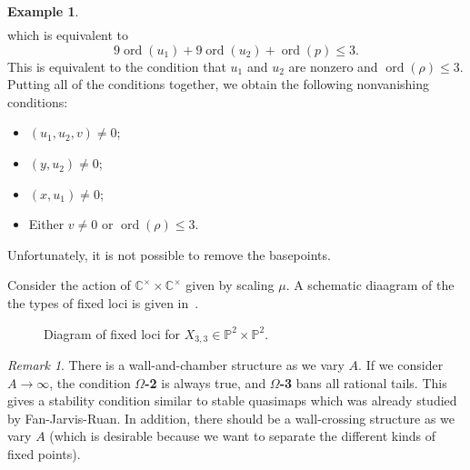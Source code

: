 \documentclass[10pt]{amsart}
\theoremstyle{definition}
\newtheorem{exm}[thm]{Example}
\theoremstyle{remark}
\newtheorem{rmk}[thm]{Remark}
\theoremstyle{plain}
\theoremstyle{definition}
\theoremstyle{remark}
\newcommand{\C}{\mathbb{C}}
\renewcommand{\P}{\mathbb{P}}
\newcommand{\mc}[1]{\mathcal{#1}}
\newcommand{\mr}[1]{\mathrm{#1}}
\newcommand{\on}[1]{\operatorname{#1}}
\newcommand{\1}{\mathbf{1}}
\newcommand{\2}{\mathbf{2}}
\newcommand{\3}{\mathbf{3}}
\begin{document}
\begin{exm}
\begin{align*}
    \end{align*}
    which is equivalent to
    \[ 9 \on{ord}(u_1) + 9 \on{ord}(u_2) + \on{ord}(p) \leq 3. \]
    This is equivalent to the condition that $u_1$ and $u_2$ are nonzero and $\on{ord}(\rho)\leq 3$. Putting all of the conditions together, we obtain the following nonvanishing conditions:
    \begin{itemize}
        \item $(u_1, u_2, v) \neq 0$;
        \item $(y, u_2) \neq 0$;
        \item $(x, u_1) \neq 0$;
        \item Either $v \neq 0$ or $\on{ord}(\rho) \leq 3$.
    \end{itemize}
    Unfortunately, it is not possible to remove the basepoints.

    Consider the action of $\C^{\times} \times \C^{\times}$ given by scaling $\mu$. A schematic diaagram of the the types of fixed loci is given in~.
    \begin{figure}[htpb]
    \begin{center}
    \end{center}
    \caption{Diagram of fixed loci for $X_{3,3} \in \P^2 \times \P^2$.}%
    \label{fig:p2p2loc}
    \end{figure}
\end{exm}

\begin{rmk}
    There is a wall-and-chamber structure as we vary $A$. If we consider $A \to \infty$, the condition \textbf{$\Omega$-2} is always true, and \textbf{$\Omega$-3} bans all rational tails. This gives a stability condition similar to stable quasimaps which was already studied by Fan-Jarvis-Ruan. In addition, there should be a wall-crossing structure as we vary $A$ (which is desirable because we want to separate the different kinds of fixed points).
\end{rmk}
\end{document}

